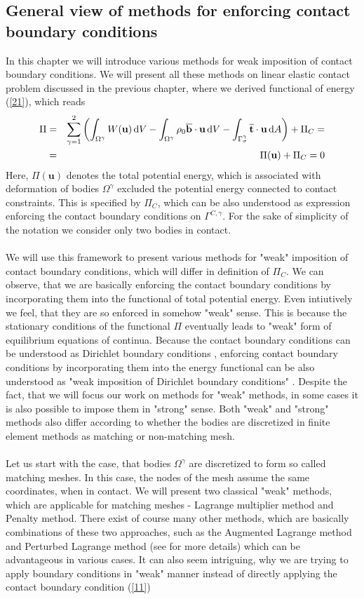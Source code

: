 \documentclass{article}
\newcommand{\bea}{\begin{eqnarray}}
\newcommand{\eea}{\end{eqnarray}}
\newcommand{\dd}{\,{\rm d}}
\begin{document}
\subsection{General view of methods for enforcing contact boundary conditions}
In this chapter we will introduce various methods for weak imposition of contact boundary conditions. We will present all these methods on linear elastic contact problem discussed in the previous chapter, where we derived functional of energy (\ref{21}), which reads
\bea
\Pi&=&\sum^{2}_{\gamma = 1}\left(\int_{\Omega^{\gamma}} W(\mathbf{u})\dd V-\int_{\Omega^{\gamma}} \rho_{0}\overline{\mathbf{b}} \cdot \mathbf{u} \dd V-\int_{\Gamma_{\sigma}^{\gamma}} \overline{\mathbf{t}} \cdot \mathbf{u} \dd A\right) + \Pi_{C}=
\nonumber
\\
&=&\Pi(\mathbf{u})+ \Pi_{C} = 0
\nonumber
\eea   
Here, $ \Pi(\mathbf{u}) $ denotes the total potential energy, which is associated with deformation of bodies $\Omega^{\gamma}$ excluded the potential energy connected to contact constraints. This is specified by $ \Pi_{C} $, which can be also understood as expression enforcing the contact boundary conditions on $\Gamma^{C,\gamma}$. For the sake of simplicity of the notation we consider only two bodies in contact.  
\\
\\
We will use this framework to present various methods for "weak" imposition of contact boundary conditions, which will differ in definition of $ \Pi_{C} $. We can observe, that we are basically enforcing the contact boundary conditions by incorporating them into the functional of total potential energy. Even intiutively we feel, that they are so enforced in somehow "weak" sense. This is because the stationary conditions of the functional $ \Pi $ eventually leads to "weak" form of equilibrium equations of continua. Because the contact boundary conditions can be understood as Dirichlet boundary conditions \cite[Chapter 4, p.109]{Yastrebov}, enforcing contact boundary conditions by incorporating them into the energy functional can be also understood as "weak imposition of Dirichlet boundary conditions" \cite{Augarde}. Despite the fact, that we will focus our work on methods for "weak" methods, in some cases it is also possible to impose them in "strong" sense. Both "weak" and "strong" methods also differ according to whether the bodies are discretized in finite element methods as matching or non-matching mesh.
\\
\\
Let us start with the case, that bodies $\Omega^{\gamma} $ are discretized to form so called matching meshes. In this case, the nodes of the mesh assume the same coordinates, when in contact. We will present two classical "weak" methods, which are applicable for matching meshes - Lagrange multiplier method and Penalty method. There exist of course many other methods, which are basically combinations of these two approaches, such as the Augmented Lagrange method and Perturbed Lagrange method (see \cite[Chapter 5, p.100]{Wriggers} for more details) which can be advantageous in various cases. It can also seem intriguing, why we are trying to apply boundary conditions in "weak" manner instead of directly applying the contact boundary condition (\ref{11})
\end{document}

